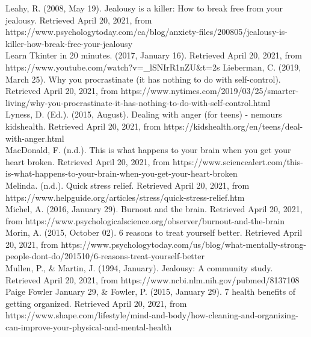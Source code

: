\documentclass{article}
\begin{document}
    Leahy, R. (2008, May 19). Jealousy is a killer: How to break free from your jealousy. Retrieved April 20, 2021, from https://www.psychologytoday.com/ca/blog/anxiety-files/200805/jealousy-is-killer-how-break-free-your-jealousy \\

    Learn Tkinter in 20 minutes. (2017, January 16). Retrieved April 20, 2021, from https://www.youtube.com/watch?v=\_lSNIrR1nZU&t=2s
    Lieberman, C. (2019, March 25). Why you procrastinate (it has nothing to do with self-control). Retrieved April 20, 2021, from https://www.nytimes.com/2019/03/25/smarter-living/why-you-procrastinate-it-has-nothing-to-do-with-self-control.html \\

    Lyness, D. (Ed.). (2015, August). Dealing with anger (for teens) - nemours kidshealth. Retrieved April 20, 2021, from https://kidshealth.org/en/teens/deal-with-anger.html \\

    MacDonald, F. (n.d.). This is what happens to your brain when you get your heart broken. Retrieved April 20, 2021, from https://www.sciencealert.com/this-is-what-happens-to-your-brain-when-you-get-your-heart-broken \\

    Melinda. (n.d.). Quick stress relief. Retrieved April 20, 2021, from \\ https://www.helpguide.org/articles/stress/quick-stress-relief.htm \\

    Michel, A. (2016, January 29). Burnout and the brain. Retrieved April 20, 2021, from https://www.psychologicalscience.org/observer/burnout-and-the-brain \\

    Morin, A. (2015, October 02). 6 reasons to treat yourself better. Retrieved April 20, 2021, from https://www.psychologytoday.com/us/blog/what-mentally-strong-people-dont-do/201510/6-reasons-treat-yourself-better \\

    Mullen, P., & Martin, J. (1994, January). Jealousy: A community study. Retrieved April 20, 2021, from https://www.ncbi.nlm.nih.gov/pubmed/8137108 \\

    Paige Fowler January 29, & Fowler, P. (2015, January 29). 7 health benefits of getting organized. Retrieved April 20, 2021, from \\https://www.shape.com/lifestyle/mind-and-body/how-cleaning-and-organizing-can-improve-your-physical-and-mental-health \\
\end{document}

